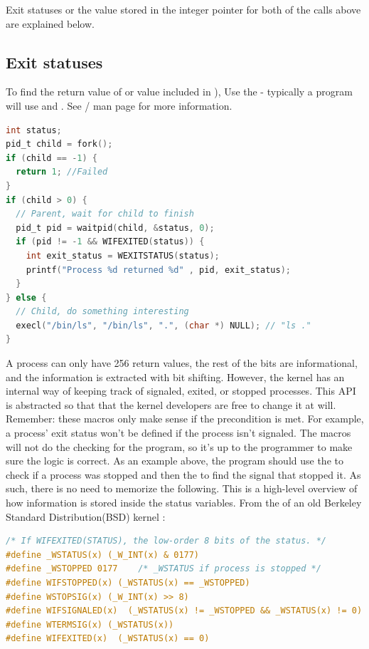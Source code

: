 Exit statuses or the value stored in the integer pointer for both of the calls above are explained below.

\subsection{Exit statuses}

To find the return value of  or value included in ), Use the  - typically a program will use  and  .
See / man page for more information.

\begin{lstlisting}[language=C]
int status;
pid_t child = fork();
if (child == -1) {
  return 1; //Failed
}
if (child > 0) {
  // Parent, wait for child to finish
  pid_t pid = waitpid(child, &status, 0);
  if (pid != -1 && WIFEXITED(status)) {
    int exit_status = WEXITSTATUS(status);
    printf("Process %d returned %d" , pid, exit_status);
  }
} else {
  // Child, do something interesting
  execl("/bin/ls", "/bin/ls", ".", (char *) NULL); // "ls ."
}
\end{lstlisting}

A process can only have 256 return values, the rest of the bits are informational, and the information is extracted with bit shifting.
However, the kernel has an internal way of keeping track of signaled, exited, or stopped processes.
This API is abstracted so that that the kernel developers are free to change it at will.
Remember: these macros only make sense if the precondition is met.
For example, a process' exit status won't be defined if the process isn't signaled.
The macros will not do the checking for the program, so it's up to the programmer to make sure the logic is correct.
As an example above, the program should use the  to check if a process was stopped and then the  to find the signal that stopped it.
As such, there is no need to memorize the following. This is a high-level overview of how information is stored inside the status variables. From the  of an old Berkeley Standard Distribution(BSD) kernel \cite{sys/wait.h}:

\begin{lstlisting}[language=C]
/* If WIFEXITED(STATUS), the low-order 8 bits of the status. */
#define _WSTATUS(x) (_W_INT(x) & 0177)
#define _WSTOPPED 0177    /* _WSTATUS if process is stopped */
#define WIFSTOPPED(x) (_WSTATUS(x) == _WSTOPPED)
#define WSTOPSIG(x) (_W_INT(x) >> 8)
#define WIFSIGNALED(x)  (_WSTATUS(x) != _WSTOPPED && _WSTATUS(x) != 0)
#define WTERMSIG(x) (_WSTATUS(x))
#define WIFEXITED(x)  (_WSTATUS(x) == 0)
\end{lstlisting}

